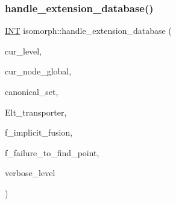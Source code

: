 \mbox{\label{classisomorph_ad98512c3c74bafd90d4d23cf048ebc2e}} 
\subsubsection{\texorpdfstring{handle\+\_\+extension\+\_\+database()}{handle\_extension\_database()}}
{\footnotesize\ttfamily \mbox{\hyperlink{galois_8h_a09fddde158a3a20bd2dcadb609de11dc}{I\+NT}} isomorph\+::handle\+\_\+extension\+\_\+database (\begin{DoxyParamCaption}\item[{\mbox{\hyperlink{galois_8h_a09fddde158a3a20bd2dcadb609de11dc}{I\+NT}}}]{cur\+\_\+level,  }\item[{\mbox{\hyperlink{galois_8h_a09fddde158a3a20bd2dcadb609de11dc}{I\+NT}}}]{cur\+\_\+node\+\_\+global,  }\item[{\mbox{\hyperlink{galois_8h_a09fddde158a3a20bd2dcadb609de11dc}{I\+NT}} $\ast$}]{canonical\+\_\+set,  }\item[{\mbox{\hyperlink{galois_8h_a09fddde158a3a20bd2dcadb609de11dc}{I\+NT}} $\ast$}]{Elt\+\_\+transporter,  }\item[{\mbox{\hyperlink{galois_8h_a09fddde158a3a20bd2dcadb609de11dc}{I\+NT}}}]{f\+\_\+implicit\+\_\+fusion,  }\item[{\mbox{\hyperlink{galois_8h_a09fddde158a3a20bd2dcadb609de11dc}{I\+NT}} \&}]{f\+\_\+failure\+\_\+to\+\_\+find\+\_\+point,  }\item[{\mbox{\hyperlink{galois_8h_a09fddde158a3a20bd2dcadb609de11dc}{I\+NT}}}]{verbose\+\_\+level }\end{DoxyParamCaption})}

\mbox{\label{classisomorph_acc99e89e75ae8f8ddf2d5d5160363c6e}} 
